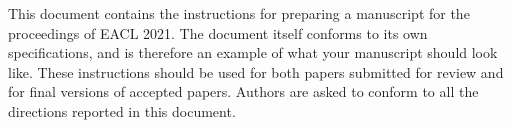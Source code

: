 
    This document contains the instructions for preparing a manuscript for the proceedings of EACL 2021.
    The document itself conforms to its own specifications, and is therefore an example of what your manuscript should look like.
    These instructions should be used for both papers submitted for review and for final versions of accepted papers.
    Authors are asked to conform to all the directions reported in this document.
